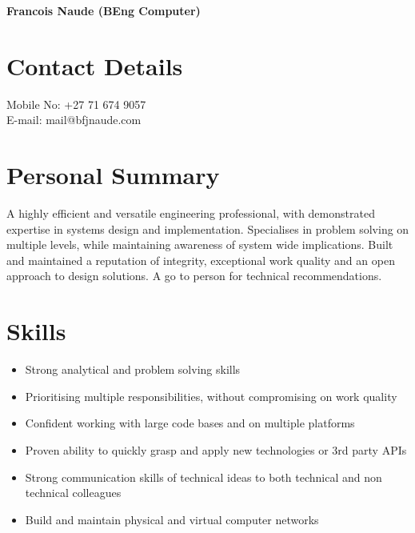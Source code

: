 \documentclass[11pt,a4paper]{article}
\begin{document}
\noindent
{\bfseries\LARGE Francois Naude (BEng Computer)}\\ 

\section*{Contact Details}
{\large
Mobile No: +27 71 674 9057\\
E-mail: mail@bfjnaude.com
}
\section*{Personal Summary}
A highly efficient and versatile engineering professional, with demonstrated expertise in
systems design and implementation. Specialises in problem solving on multiple levels, while
maintaining awareness of system wide implications. Built and maintained a reputation of
integrity, exceptional work quality and an open approach to design solutions. A go to person for
technical recommendations.

\section*{Skills}
\begin{itemize}
	\item Strong analytical and problem solving skills
	\item Prioritising multiple responsibilities, without compromising on work quality
	\item Confident working with large code bases and on multiple platforms
	\item Proven ability to quickly grasp and apply new technologies or 3rd party APIs
	\item Strong communication skills of technical ideas to both technical and non technical colleagues 
	\item Build and maintain physical and virtual computer networks 
\end{itemize}
\end{document}
